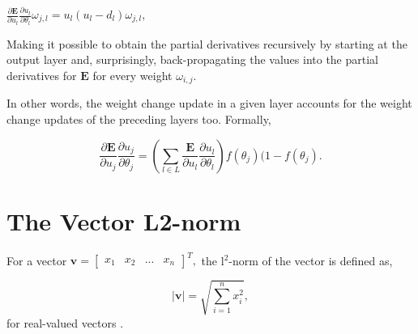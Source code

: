 \begin{center}
\begin{math}
    \frac{\partial \textbf{E}}{\partial u_l} \frac{\partial u_l}{\partial \theta_l} \omega_{j,l} = 
    u_l (u_l - d_l) \omega_{j,l},
\end{math}
\end{center}
Making it possible to obtain the partial derivatives recursively by starting at the output layer and, surprisingly, back-propagating the values into the partial derivatives for $\textbf{E}$ for every weight $\omega_{i,j}$.

In other words, the weight change update in a given layer accounts for the weight change updates of the preceding layers too. Formally,

\begin{equation}
    \frac{\partial \textbf{E}}{\partial u_j}\frac{\partial u_j}{\partial \theta_j} = 
    (\sum_{l \in L}\frac{\textbf{E}}{\partial u_l}\frac{\partial u_l}{\partial \theta_l}) f(\theta_j)(1-f(\theta_j).
\end{equation}

\section*{The Vector L2-norm}\label{l2-norm}

For a vector
\begin{math}
    \textbf{v} = \begin{bmatrix} x_1 & x_2 & ... & x_n
        \end{bmatrix}^T,
\end{math}
the l$^2$-norm of the vector is defined as,

\begin{equation}
    |\textbf{v}| = \sqrt{\sum_{i=1}^{n} x_i^2},
\end{equation}
for real-valued vectors \citep{Kreyszig2011chpt204}.

\clearpage